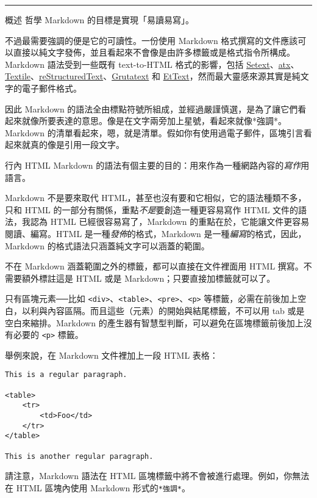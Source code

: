 \begin{center}\rule{3in}{0.4pt}\end{center}

概述
哲學
Markdown 的目標是實現「易讀易寫」。

不過最需要強調的便是它的可讀性。一份使用 Markdown
格式撰寫的文件應該可以直接以純文字發佈，並且看起來不會像是由許多標籤或是格式指令所構成。Markdown
語法受到一些既有 text-to-HTML 格式的影響，包括
\href{http://docutils.sourceforge.net/mirror/setext.html}{Setext}、\href{http://www.aaronsw.com/2002/atx/}{atx}、\href{http://textism.com/tools/textile/}{Textile}、\href{http://docutils.sourceforge.net/rst.html}{reStructuredText}、\href{http://www.triptico.com/software/grutatxt.html}{Grutatext}
和
\href{http://ettext.taint.org/doc/}{EtText}，然而最大靈感來源其實是純文字的電子郵件格式。

因此 Markdown
的語法全由標點符號所組成，並經過嚴謹慎選，是為了讓它們看起來就像所要表達的意思。像是在文字兩旁加上星號，看起來就像*強調*。Markdown
的清單看起來，嗯，就是清單。假如你有使用過電子郵件，區塊引言看起來就真的像是引用一段文字。

行內 HTML
Markdown 的語法有個主要的目的：用來作為一種網路內容的\emph{寫作}用語言。

Markdown 不是要來取代 HTML，甚至也沒有要和它相似，它的語法種類不多，只和
HTML 的一部分有關係，重點\emph{不是}要創造一種更容易寫作 HTML
文件的語法，我認為 HTML 已經很容易寫了，Markdown
的重點在於，它能讓文件更容易閱讀、編寫。HTML
是一種\emph{發佈}的格式，Markdown 是一種\emph{編寫}的格式，因此，Markdown
的格式語法只涵蓋純文字可以涵蓋的範圍。

不在 Markdown 涵蓋範圍之外的標籤，都可以直接在文件裡面用 HTML
撰寫。不需要額外標註這是 HTML 或是 Markdown；只要直接加標籤就可以了。

只有區塊元素──比如
\texttt{\textless{}div\textgreater{}}、\texttt{\textless{}table\textgreater{}}、\texttt{\textless{}pre\textgreater{}}、\texttt{\textless{}p\textgreater{}}
等標籤，必需在前後加上空白，以利與內容區隔。而且這些（元素）的開始與結尾標籤，不可以用
tab 或是空白來縮排。Markdown
的產生器有智慧型判斷，可以避免在區塊標籤前後加上沒有必要的
\texttt{\textless{}p\textgreater{}} 標籤。

舉例來說，在 Markdown 文件裡加上一段 HTML 表格：

\begin{verbatim}
This is a regular paragraph.

<table>
    <tr>
        <td>Foo</td>
    </tr>
</table>

This is another regular paragraph.
\end{verbatim}
請注意，Markdown 語法在 HTML 區塊標籤中將不會被進行處理。例如，你無法在
HTML 區塊內使用 Markdown 形式的\texttt{*強調*}。

